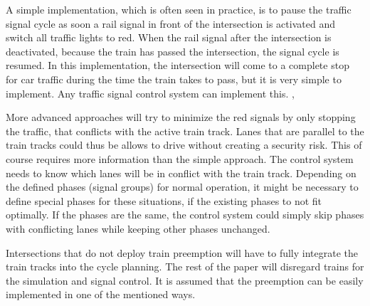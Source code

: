 A simple implementation, which is often seen in practice, is to pause the traffic signal cycle as soon a rail signal in front of the intersection is activated and switch all traffic lights to red. When the rail signal after the intersection is deactivated, because the train has passed the intersection, the signal cycle is resumed. In this implementation, the intersection will come to a complete stop for car traffic during the time the train takes to pass, but it is very simple to implement. Any traffic signal control system can implement this. \cite{mutcd}, \cite{ptsnrc}

More advanced approaches will try to minimize the red signals by only stopping the traffic, that conflicts with the active train track. Lanes that are parallel to the train tracks could thus be allows to drive without creating a security risk. This of course requires more information than the simple approach. The control system needs to know which lanes will be in conflict with the train track. Depending on the defined phases (signal groups) for normal operation, it might be necessary to define special phases for these situations, if the existing phases to not fit optimally. If the phases are the same, the control system could simply skip phases with conflicting lanes while keeping other phases unchanged.

Intersections that do not deploy train preemption will have to fully integrate the train tracks into the cycle planning. The rest of the paper will disregard trains for the simulation and signal control. It is assumed that the preemption can be easily implemented in one of the mentioned ways.
